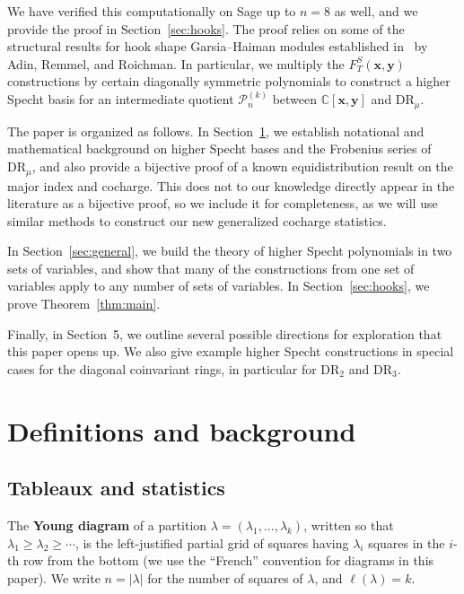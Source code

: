 \documentclass[11pt]{article}
\theoremstyle{definition}
\numberwithin{equation}{section}
\newcommand{\DR}{\mathrm{DR}}
\begin{document}
We have verified this computationally on Sage up to $n=8$ as well, and we provide the proof in Section~\ref{sec:hooks}.  The proof relies on some of the structural results for hook shape Garsia--Haiman modules established in~\cite{HookBases} by Adin, Remmel, and Roichman.  In particular, we multiply the $F_T^S(\mathbf{x},\mathbf{y})$ constructions by certain diagonally symmetric polynomials to construct a higher Specht basis for an intermediate quotient $\mathcal{P}_n^{(k)}$ between $\mathbb{C}[\mathbf{x},\mathbf{y}]$ and $\DR_\mu$.

The paper is organized as follows.  In Section~\ref{sec:background}, we establish notational and mathematical background on higher Specht bases and the Frobenius series of $\DR_\mu$, and also provide a bijective proof of a known equidistribution result on the major index and cocharge.  This does not to our knowledge directly appear in the literature as a bijective proof, so we include it for completeness, as we will use similar methods to construct our new generalized cocharge statistics.

In Section~\ref{sec:general}, we build the theory of higher Specht polynomials in two sets of variables, and show that many of the constructions from one set of variables apply to any number of sets of variables.  In Section~\ref{sec:hooks}, we prove Theorem~\ref{thm:main}.

Finally, in Section~5, we outline several possible directions for exploration that this paper opens up.  We also give example higher Specht constructions in special cases for the diagonal coinvariant rings, in particular for $\DR_2$ and $\DR_3$.


\section{Definitions and background}\label{sec:background}

\subsection{Tableaux and statistics}

The \textbf{Young diagram} of a partition $\lambda=(\lambda_1,\ldots,\lambda_k)$, written so that $\lambda_1\ge \lambda_2\ge \cdots$, is the left-justified partial grid of squares having $\lambda_i$ squares in the $i$-th row from the bottom (we use the ``French'' convention for diagrams in this paper).  We write $n=|\lambda|$ for the number of squares of $\lambda$, and $\ell(\lambda)=k$.
\end{document}
